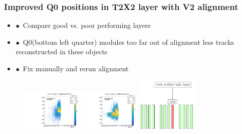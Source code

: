 \documentclass[aspectratio=1610, 12pt, xcolor=dvipsnames]{beamer}
\begin{document}
\begin{frame}\frametitle{Improved Q0 positions in T2X2 layer with V2 alignment}
  \begin{itemize}
    \item $\bullet$\, Compare good vs. poor performing layers
    \item $\bullet$\, Q0(bottom left quarter) modules too far out of alignment \to less tracks reconstructed in these objects
    \item $\bullet$\, Fix manually and rerun alignment
  \end{itemize}
  \begin{figure}
    \includegraphics[width=0.26\textwidth]{logos/2D_nodeXY_v2_7_left.pdf}%
    \includegraphics[width=0.26\textwidth]{logos/2D_nodeXY_quartermean_7_left.pdf}%
    \includegraphics[width=0.26\textwidth]{problem_layer.png}%
  \end{figure}
\end{frame}
\end{document}
